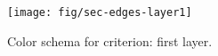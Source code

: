 \begin{figure}[!ht]
\begin{center}
\texttt{[image: fig/sec-edges-layer1]}
\caption{\label{fig:sec-edges-1} Color schema for
 criterion: first layer.}
\end{center}
\end{figure}
